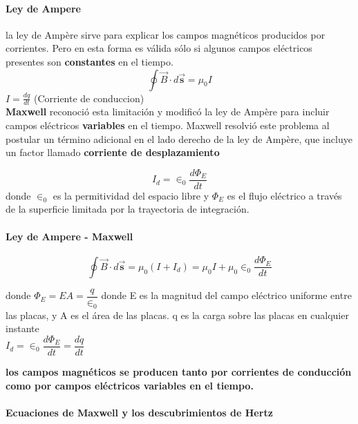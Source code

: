 \documentclass[10pt]{article}
\begin{document}
\paragraph{Ley de Ampere} la ley de Ampère sirve para explicar los
campos magnéticos producidos por corrientes. Pero en esta forma es válida sólo si algunos campos eléctricos
presentes son \textbf{constantes} en el tiempo.
\begin{equation*}
	\oint \overrightarrow{B} \cdot d \overrightarrow{\textbf{s}} = \mu_0 I
\end{equation*}
$I = \frac{dq}{dt}$ (Corriente de conduccion)\\
\linebreak
\textbf{Maxwell} reconoció esta limitación y
modificó la ley de Ampère para incluir campos eléctricos \textbf{variables} en el tiempo.
Maxwell resolvió este problema al postular un término adicional en el
lado derecho de la ley de Ampère, que incluye un factor llamado \textbf{corriente de desplazamiento}

\begin{equation*}
	I_d = \in_0 \dfrac{d\Phi_E}{dt}
\end{equation*}
donde $\in_0$ es la permitividad del espacio libre y $\Phi_E$ es el
flujo eléctrico a través de la superficie limitada por la trayectoria
de integración.

\paragraph{Ley de Ampere - Maxwell}
\begin{equation*}
	\oint \overrightarrow{B} \cdot d \overrightarrow{\textbf{s}} = \mu_0 (I + I_d) = \mu_0 I + \mu_0 \in_0 \dfrac{d\Phi_E}{dt}
\end{equation*}

donde $\Phi_E = EA = \dfrac{q}{\in_0}$ donde E es la magnitud del campo eléctrico uniforme entre las placas, y A es  el área de las placas. q es la carga sobre las placas en cualquier instante\\
$I_d = \in_0 \dfrac{d\Phi_E}{dt} = \dfrac{dq}{dt}$

\textbf{ los campos magnéticos se producen tanto por corrientes de conducción como por campos eléctricos variables en el tiempo.}

\paragraph{Ecuaciones de Maxwell y los descubrimientos de Hertz}
\end{document}
